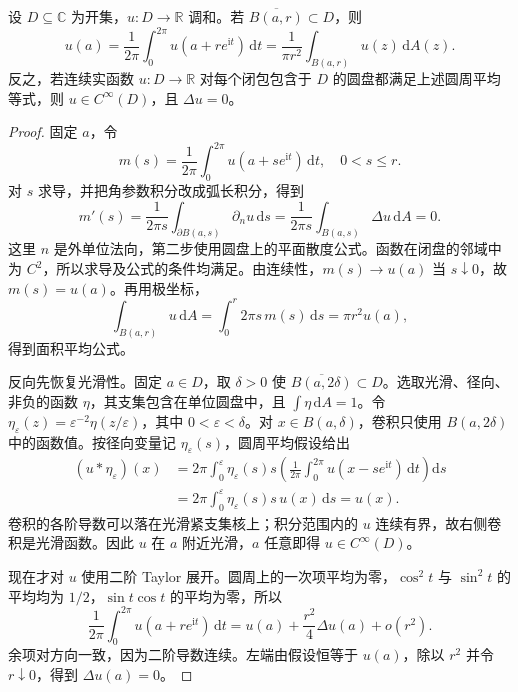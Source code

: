 \begin{theorem}[调和函数的平均值性质]\label{b3:thm:15-mean-value}
设 \(D\subseteq\mathbb C\) 为开集，\(u:D\to\mathbb R\) 调和。若 \(\overline{B(a,r)}\subset D\)，则
\[
 u(a)=\frac{1}{2\pi}\int_0^{2\pi}u(a+re^{\mathrm i t})\,\mathrm dt
 =\frac{1}{\pi r^2}\int_{B(a,r)}u(z)\,\mathrm dA(z).
\]
反之，若连续实函数 \(u:D\to\mathbb R\) 对每个闭包包含于 \(D\) 的圆盘都满足上述圆周平均等式，则 \(u\in C^\infty(D)\)，且 \(\Delta u=0\)。
\end{theorem}
\begin{proof}
固定 \(a\)，令
\[
 m(s)=\frac{1}{2\pi}\int_0^{2\pi}u(a+se^{\mathrm i t})\,\mathrm dt,
 \quad 0<s\le r.
\]
对 \(s\) 求导，并把角参数积分改成弧长积分，得到
\[
 m'(s)=\frac{1}{2\pi s}\int_{\partial B(a,s)}\partial_nu\,\mathrm ds
 =\frac{1}{2\pi s}\int_{B(a,s)}\Delta u\,\mathrm dA=0.
\]
这里 \(n\) 是外单位法向，第二步使用圆盘上的平面散度公式。函数在闭盘的邻域中为 \(C^2\)，所以求导及公式的条件均满足。由连续性，\(m(s)\to u(a)\) 当 \(s\downarrow0\)，故 \(m(s)=u(a)\)。再用极坐标，
\[
 \int_{B(a,r)}u\,\mathrm dA
 =\int_0^r2\pi s\,m(s)\,\mathrm ds
 =\pi r^2u(a),
\]
得到面积平均公式。

反向先恢复光滑性。固定 \(a\in D\)，取 \(\delta>0\) 使 \(\overline{B(a,2\delta)}\subset D\)。选取光滑、径向、非负的函数 \(\eta\)，其支集包含在单位圆盘中，且 \(\int\eta\,\mathrm dA=1\)。令 \(\eta_\varepsilon(z)=\varepsilon^{-2}\eta(z/\varepsilon)\)，其中 \(0<\varepsilon<\delta\)。对 \(x\in B(a,\delta)\)，卷积只使用 \(B(a,2\delta)\) 中的函数值。按径向变量记 \(\eta_\varepsilon(s)\)，圆周平均假设给出
\[
 \begin{aligned}
 (u*\eta_\varepsilon)(x)
 &=2\pi\int_0^\varepsilon\eta_\varepsilon(s)s
 \left(\frac{1}{2\pi}\int_0^{2\pi}
 u(x-se^{\mathrm i t})\,\mathrm dt\right)\mathrm ds\\
 &=2\pi\int_0^\varepsilon\eta_\varepsilon(s)s\,u(x)\,\mathrm ds
 =u(x).
 \end{aligned}
\]
卷积的各阶导数可以落在光滑紧支集核上；积分范围内的 \(u\) 连续有界，故右侧卷积是光滑函数。因此 \(u\) 在 \(a\) 附近光滑，\(a\) 任意即得 \(u\in C^\infty(D)\)。

现在才对 \(u\) 使用二阶 Taylor 展开。圆周上的一次项平均为零，\(\cos^2t\) 与 \(\sin^2t\) 的平均均为 \(1/2\)，\(\sin t\cos t\) 的平均为零，所以
\[
 \frac{1}{2\pi}\int_0^{2\pi}u(a+re^{\mathrm i t})\,\mathrm dt
 =u(a)+\frac{r^2}{4}\Delta u(a)+o(r^2).
\]
余项对方向一致，因为二阶导数连续。左端由假设恒等于 \(u(a)\)，除以 \(r^2\) 并令 \(r\downarrow0\)，得到 \(\Delta u(a)=0\)。
\end{proof}

